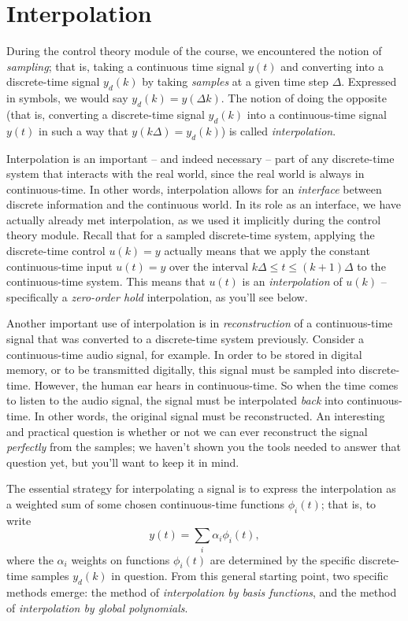 
\section{Interpolation}

During the control theory module of the course, we encountered the notion of \emph{sampling}; that is, taking a continuous time signal $y(t)$ and converting into a discrete-time signal $y_d(k)$ by taking \emph{samples} at a given time step $\Delta$. Expressed in symbols, we would say $y_d(k)=y(\Delta k)$.
The notion of doing the opposite (that is, converting a discrete-time signal $y_d(k)$ into a continuous-time signal $y(t)$ in such a way that $y(k\Delta)=y_d(k)$) is called \emph{interpolation}.

Interpolation is an important -- and indeed necessary -- part of any discrete-time system that interacts with the real world, since the real world is always in continuous-time.
In other words, interpolation allows for an \emph{interface} between discrete information and the continuous world.
In its role as an interface, we have actually already met interpolation, as we used it implicitly during the control theory module.
Recall that for a sampled discrete-time system, applying the discrete-time control $u(k)=y$ actually means that we apply the constant continuous-time input $u(t)=y$ over the interval $k\Delta\le t \le (k+1)\Delta$ to the continuous-time system.
This means that $u(t)$ is an \emph{interpolation} of $u(k)$ -- specifically a \emph{zero-order hold} interpolation, as you'll see below.

Another important use of interpolation is in \emph{reconstruction} of a continuous-time signal that was converted to a discrete-time system previously.
Consider a continuous-time audio signal, for example.
In order to be stored in digital memory, or to be transmitted digitally, this signal must be sampled into discrete-time.
However, the human ear hears in continuous-time.
So when the time comes to listen to the audio signal, the signal must be interpolated \emph{back} into continuous-time.
In other words, the original signal must be reconstructed.
An interesting and practical question is whether or not we can ever reconstruct the signal \emph{perfectly} from the samples; we haven't shown you the tools needed to answer that question yet, but you'll want to keep it in mind.

The essential strategy for interpolating a signal is to express the interpolation as a weighted sum of some chosen continuous-time functions $\phi_i(t)$; that is, to write
\begin{equation*}
 y(t) = \sum_i \alpha_i \phi_i(t),
\end{equation*}
where the $\alpha_i$ weights on functions $\phi_i(t)$ are determined by the specific discrete-time samples $y_d(k)$ in question.
From this general starting point, two specific methods emerge: the method of \emph{interpolation by basis functions}, and the method of \emph{interpolation by global polynomials}.

